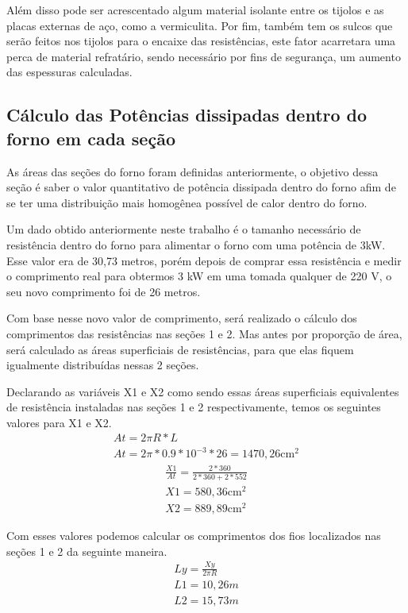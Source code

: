 Além disso pode ser acrescentado algum material isolante entre os tijolos e as placas externas de aço, como a vermiculita.
Por fim, também tem os sulcos que serão feitos nos tijolos para o encaixe das resistências, este fator acarretara uma perca de material refratário, sendo necessário por fins de segurança, um aumento das espessuras calculadas.

\subsection{Cálculo das Potências dissipadas dentro do forno em cada seção}
As áreas das seções do forno foram definidas anteriormente, o objetivo dessa seção é saber o valor quantitativo de potência dissipada dentro do forno afim de se ter uma distribuição mais homogênea possível de calor dentro do forno.

Um dado obtido anteriormente neste trabalho é o tamanho necessário de resistência dentro do forno para alimentar o forno com uma potência de 3kW. Esse valor era de 30,73 metros, porém depois de comprar essa resistência e medir o comprimento real para obtermos 3 kW em uma tomada qualquer de 220 V, o seu novo comprimento foi de 26 metros.

Com base nesse novo valor de comprimento, será realizado o cálculo dos comprimentos das resistências nas seções 1 e 2. Mas antes por proporção de área, será calculado as áreas superficiais de resistências, para que elas fiquem igualmente distribuídas nessas 2 seções.

Declarando as variáveis X1 e X2 como sendo essas áreas superficiais equivalentes de resistência instaladas nas seções 1 e 2 respectivamente, temos os seguintes valores para X1 e X2.
\begin{gather}
    At = 2\pi R*L \\
    At = 2\pi * 0.9 * 10^{-3} * 26 = 1470,26\text{cm}^{2} \nonumber
\end{gather}
\begin{gather}
   \frac{X1}{At} = \frac{2 * 360}{2 * 360 + 2 * 552} \nonumber \\
   X1 = 580,36\text{cm}^{2} \nonumber \\
   X2 = 889,89\text{cm}^{2} \nonumber
\end{gather}

Com esses valores podemos calcular os comprimentos dos fios localizados nas seções 1 e 2 da seguinte maneira.
\begin{gather}
    Ly = \frac{Xy}{2\pi R} \\
    L1 = 10,26m \nonumber \\
    L2 = 15,73m \nonumber
\end{gather}



